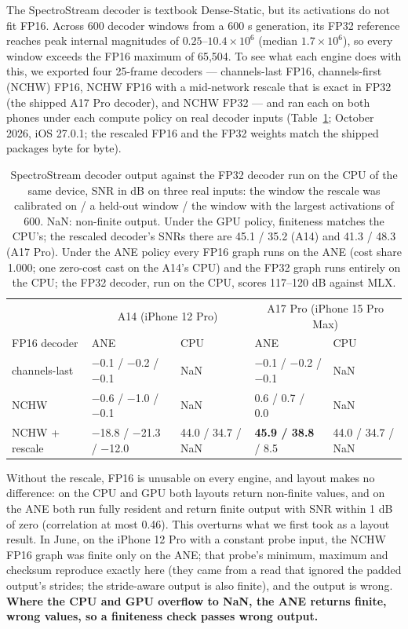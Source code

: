 \documentclass[11pt]{article}
\begin{document}
The SpectroStream decoder is textbook Dense-Static, but its activations do not fit FP16. Across 600 decoder windows from a 600 s generation, its FP32 reference reaches peak internal magnitudes of $0.25$--$10.4\times10^{6}$ (median $1.7\times10^{6}$), so every window exceeds the FP16 maximum of 65,504. To see what each engine does with this, we exported four 25-frame decoders --- channels-last FP16, channels-first (NCHW) FP16, NCHW FP16 with a mid-network rescale that is exact in FP32 (the shipped A17 Pro decoder), and NCHW FP32 --- and ran each on both phones under each compute policy on real decoder inputs (Table~\ref{tab:cs2-decoder}; October 2026, iOS 27.0.1; the rescaled FP16 and the FP32 weights match the shipped packages byte for byte).

\begin{table}[h]
\centering
\footnotesize
\caption{SpectroStream decoder output against the FP32 decoder run on the CPU of the same device, SNR in dB on three real inputs: the window the rescale was calibrated on / a held-out window / the window with the largest activations of 600. NaN: non-finite output. Under the GPU policy, finiteness matches the CPU's; the rescaled decoder's SNRs there are 45.1 / 35.2 (A14) and 41.3 / 48.3 (A17 Pro). Under the ANE policy every FP16 graph runs on the ANE (cost share 1.000; one zero-cost cast on the A14's CPU) and the FP32 graph runs entirely on the CPU; the FP32 decoder, run on the CPU, scores 117--120 dB against MLX.}
\label{tab:cs2-decoder}
\begin{tabular}{@{}lllll@{}}
\toprule
 & \multicolumn{2}{c}{A14 (iPhone 12 Pro)} & \multicolumn{2}{c}{A17 Pro (iPhone 15 Pro Max)} \\
FP16 decoder & ANE & CPU & ANE & CPU \\
\midrule
channels-last          & $-$0.1 / $-$0.2 / $-$0.1 & NaN & $-$0.1 / $-$0.2 / $-$0.1 & NaN \\
NCHW                   & $-$0.6 / $-$1.0 / $-$0.1 & NaN & 0.6 / 0.7 / 0.0 & NaN \\
NCHW + rescale         & $-$18.8 / $-$21.3 / $-$12.0 & 44.0 / 34.7 / NaN & \textbf{45.9 / 38.8} / 8.5 & 44.0 / 34.7 / NaN \\
\bottomrule
\end{tabular}
\end{table}

Without the rescale, FP16 is unusable on every engine, and layout makes no difference: on the CPU and GPU both layouts return non-finite values, and on the ANE both run fully resident and return finite output with SNR within 1 dB of zero (correlation at most 0.46). This overturns what we first took as a layout result. In June, on the iPhone 12 Pro with a constant probe input, the NCHW FP16 graph was finite only on the ANE; that probe's minimum, maximum and checksum reproduce exactly here (they came from a read that ignored the padded output's strides; the stride-aware output is also finite), and the output is wrong. \textbf{Where the CPU and GPU overflow to NaN, the ANE returns finite, wrong values, so a finiteness check passes wrong output.}
\end{document}
